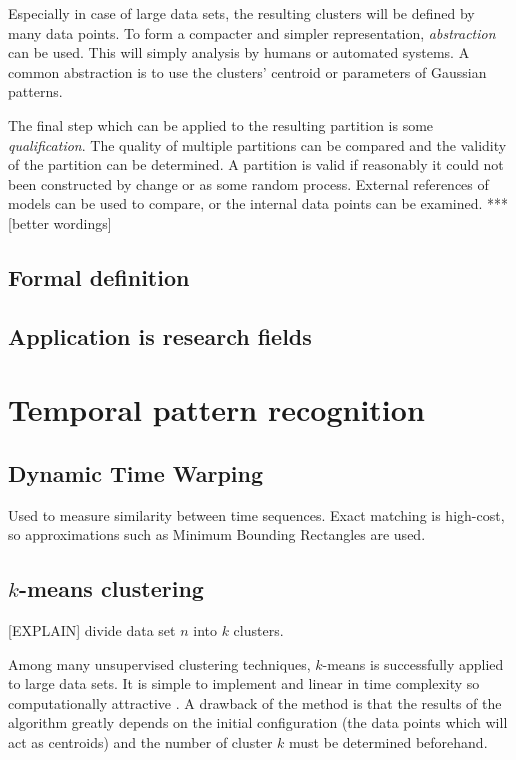Especially in case of large data sets, the resulting clusters will be defined 
by many data points. To form a compacter and simpler representation, 
\emph{abstraction} can be used. This will simply analysis by humans or 
automated systems. A common abstraction is to use the clusters' centroid 
\cite{diday1976clustering} or parameters of Gaussian patterns.

The final step which can be applied to the resulting partition is some 
\emph{qualification}. The quality of multiple partitions can be compared and 
the validity of the partition can be determined. A partition is valid if 
reasonably it could not been constructed by change or as some random process. 
External references of models can be used to compare, or the internal data 
points can be examined. *** [better wordings]



\subsection{Formal definition}






\subsection{Application is research fields}



\section{Temporal pattern recognition}

\subsection{Dynamic Time Warping}
Used to measure similarity between time sequences. Exact matching is 
high-cost, so approximations such as Minimum Bounding Rectangles are used.

\subsection{$k$-means clustering}
[EXPLAIN] divide data set $n$ into $k$ clusters.

Among many unsupervised clustering techniques, $k$-means is successfully 
applied to large data sets. It is simple to implement and linear in time 
complexity so computationally attractive \cite{jain1999data}. A drawback of 
the method is that the results of the algorithm greatly depends on the initial 
configuration (the data points which will act as centroids) and the number of 
cluster $k$ must be determined beforehand.

